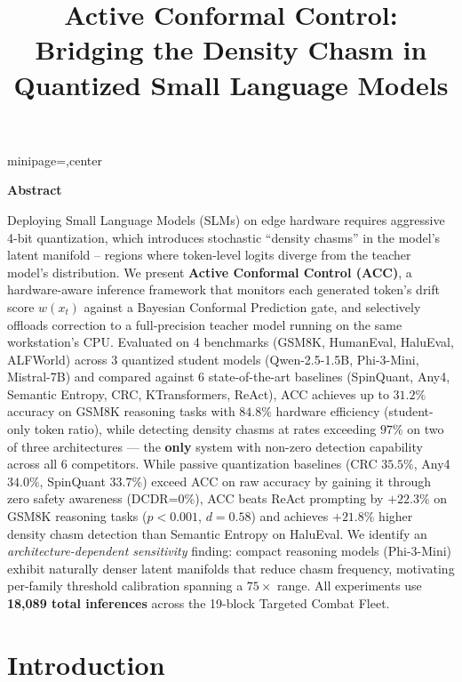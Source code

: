 \documentclass{uai2026}  %
\renewenvironment{abstract}{
    \begin{adjustbox}{minipage=\linewidth-0.5in,center}
    \centerline{\large\bfseries Abstract}
    \vspace{4pt}
}{
    \end{adjustbox}
}
\begin{document}
\title{Active Conformal Control: Bridging the Density Chasm in Quantized Small Language Models}

\maketitle
\enlargethispage{2\baselineskip}
\begin{abstract}
Deploying Small Language Models (SLMs) on edge hardware
requires aggressive 4-bit quantization, which introduces stochastic
``density chasms'' in the model's latent manifold -- regions where
token-level logits diverge from the teacher model's distribution.
We present \textbf{Active Conformal Control (ACC)},
a hardware-aware inference framework that monitors each generated token's
drift score $w(x_t)$ against a Bayesian Conformal Prediction gate,
and selectively offloads correction to a full-precision teacher model
running on the same workstation's CPU.
Evaluated on 4 benchmarks (GSM8K, HumanEval, HaluEval, ALFWorld)
across 3 quantized student models
(Qwen-2.5-1.5B, Phi-3-Mini, Mistral-7B)
and compared against 6 state-of-the-art baselines
(SpinQuant, Any4, Semantic Entropy, CRC, KTransformers, ReAct),
ACC achieves up to $31.2\%$ accuracy on GSM8K reasoning tasks
with $84.8\%$ hardware efficiency (student-only token ratio),
while detecting density chasms at rates exceeding $97\%$ on
two of three architectures --- the \textbf{only} system with non-zero
detection capability across all 6 competitors.
While passive quantization baselines (CRC $35.5\%$, Any4 $34.0\%$,
SpinQuant $33.7\%$) exceed ACC on raw accuracy by gaining it through zero
safety awareness (DCDR=0\%), ACC beats ReAct prompting by
$+22.3\%$ on GSM8K reasoning tasks ($p < 0.001$, $d = 0.58$) and achieves
$+21.8\%$ higher density chasm detection than Semantic Entropy on HaluEval.
We identify an \emph{architecture-dependent sensitivity} finding:
compact reasoning models (Phi-3-Mini) exhibit naturally denser
latent manifolds that reduce chasm frequency,
motivating per-family threshold calibration spanning a $75\times$ range.
All experiments use \textbf{18,089 total inferences} across
the 19-block Targeted Combat Fleet.
\end{abstract}
\vspace{-8pt}

\section{Introduction}
\enlargethispage{2\baselineskip}
\label{sec:intro}
\end{document}
